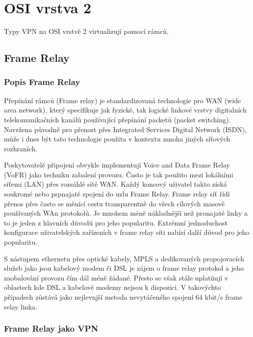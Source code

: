 \documentclass[thesis=B,czech]{FITthesis}[2012/06/26]
\begin{document}
  \section{OSI vrstva 2}

  Typy VPN na OSI vrstvě 2 virtualizují pomocí rámců.

    \subsection{Frame Relay}

      \subsubsection{Popis Frame Relay}

        Přepínání rámců (Frame relay) je standardizovaná technologie pro WAN (wide area network), který specifikuje jak fyzické, tak logické linkové vrstvy digitalních telekomunikačních kanálů používající přepínání packetů (packet switching). Navržena původně pro přenost přes Integrated Services Digital Network (ISDN), může i dnes být tato technologie použita v kontextu mnoha jiných síťových rozhraních.

        Poskytovatelé připojení obvykle implementují Voice and Data Frame Relay (VoFR) jako techniku zabalení provozu. Často je tak  použito mezi lokálními síťemi (LAN) přes rozsáhlé sítě WAN. Každý koncový uživatel takto získá soukromé nebo prpnajaté spojení do uzlu Frame Relay. Frame relay síť řídí přenos přes často se měnící cestu transparentně do všech cílových masově používaných WAn protokolů. Je mnohem méně nákladnější než pronajaté linky a to je jeden z hlavních důvodů pro jeho popularitu. Extrémní jednoduchost konfigurace uživatelských zařízeních v frame relay síti nabízí další důvod pro jeho popularitu.

        S nástupem ethernetu přes optické kabely, MPLS a dedikovaných propojovacích služeb jako jsou kabelový modem či DSL je zájem o frame relay protokol a jeho zaobalování provozu čím dál méně žádané. Přesto se však stále uplatňují v oblastech kde DSL a kabelové modemy nejsou k dispozici. V takovýchto případech zůstává jako nejlevnjší metoda nevytáčeného spojení 64 kbit/s frame relay linka. \cite{frame_relay_basics}

      \subsubsection{Frame Relay jako VPN}
\end{document}
